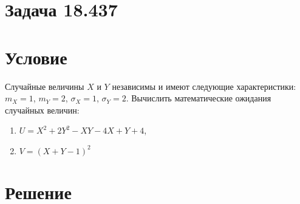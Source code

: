 \documentclass[a4paper,12pt]{article}
\begin{document}
    \section{Задача 18.437}
    \section*{Условие}
    Случайные величины $X$ и $Y$ независимы и имеют следующие характеристики: $m_X = 1$, $m_Y = 2$, $\sigma_X = 1$, $\sigma_Y = 2$.
    Вычислить математические ожидания случайных величин:
    \begin{enumerate}
        \item $U = X^2 + 2 Y^2 - XY - 4X + Y + 4$,
        \item $V = (X + Y - 1)^2$
    \end{enumerate}
    \section*{Решение}
\end{document}
